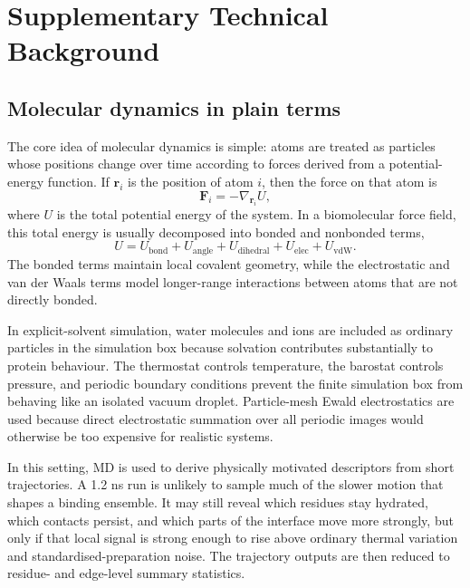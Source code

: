 \chapter{Supplementary Technical Background}
\label{ch:appendix1}

\section{Molecular dynamics in plain terms}

The core idea of molecular dynamics is simple: atoms are treated as particles whose positions change over time according to forces derived from a potential-energy function. If $\mathbf{r}_i$ is the position of atom $i$, then the force on that atom is
\begin{equation}
\mathbf{F}_i = -\nabla_{\mathbf{r}_i} U,
\end{equation}
where $U$ is the total potential energy of the system. In a biomolecular force field, this total energy is usually decomposed into bonded and nonbonded terms,
\begin{equation}
U = U_{\mathrm{bond}} + U_{\mathrm{angle}} + U_{\mathrm{dihedral}} + U_{\mathrm{elec}} + U_{\mathrm{vdW}}.
\end{equation}
The bonded terms maintain local covalent geometry, while the electrostatic and van der Waals terms model longer-range interactions between atoms that are not directly bonded.

In explicit-solvent simulation, water molecules and ions are included as ordinary particles in the simulation box because solvation contributes substantially to protein behaviour. The thermostat controls temperature, the barostat controls pressure, and periodic boundary conditions prevent the finite simulation box from behaving like an isolated vacuum droplet. Particle-mesh Ewald electrostatics are used because direct electrostatic summation over all periodic images would otherwise be too expensive for realistic systems.

In this setting, MD is used to derive physically motivated descriptors from short trajectories. A 1.2 ns run is unlikely to sample much of the slower motion that shapes a binding ensemble. It may still reveal which residues stay hydrated, which contacts persist, and which parts of the interface move more strongly, but only if that local signal is strong enough to rise above ordinary thermal variation and standardised-preparation noise. The trajectory outputs are then reduced to residue- and edge-level summary statistics.

